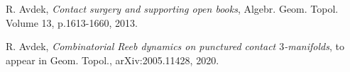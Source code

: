 \documentclass[11pt]{amsart}
\begin{document}
\begin{thebibliography}{}
\begin{comment}

\bibitem[Abb11]{Abbas:JBook}
C. Abbas, \textit{Holomorphic open book decompositions}, Duke Math. J., Vol. 158, p.29-82, 2011.

\bibitem[AbbCH05]{ACH:PlanarWeinstein}
C. Abbas, K. Cieliebak, H. Hofer, \textit{The Weinstein conjecture for planar contact structures in dimension three}, Comment. Math. Helv. 80, p.771–793, 2005.

\bibitem[AS06]{AS:Cotangent}
A. Abbondandolo and M. Schwarz, \textit{On the Floer homology of cotangent bundles}, Comm.
Pure Appl. Math., 59, p.254–316, 2006.

\bibitem[Abo15]{Abouzaid:Viterbo}
M. Abouzaid, \textit{Symplectic cohomology and Viterbo’s theorem}, In ``Free loop
spaces in geometry and topology'', volume 24 of IRMA Lect. Math. Theor. Phys., Eur. Math. Soc., Z\"{u}rich, p.271–485, 2015

\bibitem[Al79]{Ahlfors}
L. Ahlfors, \textit{Complex Analysis: An Introduction to the Theory of Analytic Functions of One Complex Variable}, New York: McGraw-Hill, 1979.


\bibitem[AS08]{AS:Pencil}
D. Auroux and I. Smith, \textit{Lefschetz pencils, branched covers and symplectic invariants}, in \textit{Symplectic 4-manifolds and algebraic surfaces}, Lecture Notes in Math vol. 1938, Springer, Berlin, p.1–53, 2008.
\end{comment}

R. Avdek, \textit{Contact surgery and supporting open books}, Algebr. Geom. Topol. Volume 13, p.1613-1660, 2013.

R. Avdek, \textit{Combinatorial Reeb dynamics on punctured contact $3$-manifolds}, to appear in Geom. Topol., arXiv:2005.11428, 2020.

\begin{comment}
\bibitem[Av21a]{Avdek:Liouville}
R. Avdek, \textit{Liouville hypersurfaces and connect sum cobordisms}, J. Symplectic Geom., Vol. 19, 2021.

\bibitem[Av21b]{Avdek:LSFT}
R. Avdek, \textit{Simplified SFT moduli spaces for Legendrian links}, arXiv:2104.00505, 2021.

\bibitem[Av22a]{Avdek:PDH}
R. Avdek, \textit{A filtered generalization of the Chekanov-Eliashberg algebra}, arXiv:2205.13031, 2022.

\bibitem[Av22b]{Avdek:Software}
R. Avdek, \textit{Legendrian links}, software available at \url{https://github.com/RAvdek/legendrian_links}, 2022.
\end{comment}


\end{thebibliography}
\end{document}
